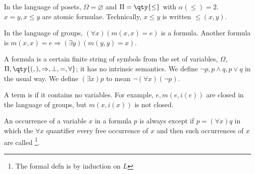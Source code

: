 \begin{example}
    In the language of posets, $\Omega = \varnothing$ and $\Pi = \qty{\leq}$ with $\alpha(\leq) = 2$.
    $x = y, x \leq y$ are atomic formulae.
    Technically, $x \leq y$ is written $\leq(x, y)$.
\end{example}

\begin{example}
    In the language of groups, $(\forall x) (m(x,x) = e)$ is a formula.
    Another formula is $m(x,x) = e \Rightarrow (\exists y) (m(y,y) = x)$.
\end{example}

\begin{remark}
    A formula is a certain finite string of symbols from the set of variables, $\Omega$, $\Pi, \qty{(, ), \implies, \bot, =, \forall}$; it has no intrinsic semantics.
    We define $\neg p, p \wedge q, p \vee q$ in the usual way.
    We define $(\exists x) p$ to mean $\neg(\forall x) (\neg p)$.
\end{remark}

A term is  if it contains no variables.
For example, $e, m(e,i(e))$ are closed in the language of groups, but $m(x,i(x))$ is not closed.

\begin{definition}
    An occurrence of a variable $x$ in a formula $p$ is always  except if $p = (\forall x) q$ in which the $\forall x$ quantifier  every free occurrence of $x$ and then such occurrences of $x$ are called \footnote{The formal defn is by induction on $L$}.
\end{definition}

